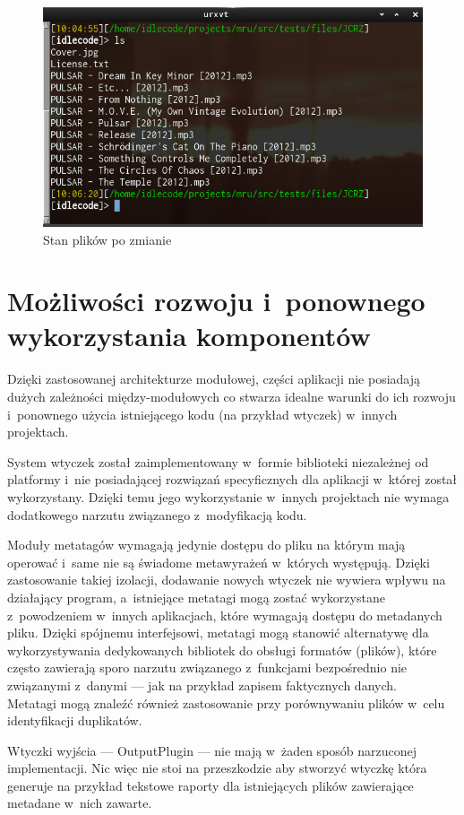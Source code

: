 \begin{figure}[h]
\begin{center}
\includegraphics[scale=0.70]{img/test_after.png}
\end{center}
\caption{Stan plików po zmianie}
\end{figure}

\section{Możliwości rozwoju i~ponownego wykorzystania komponentów}
\par
Dzięki zastosowanej architekturze modułowej, części aplikacji nie posiadają dużych zależności między-modułowych co stwarza idealne warunki do ich rozwoju i~ponownego użycia istniejącego kodu (na przykład wtyczek) w~innych projektach.

\par
System wtyczek został zaimplementowany w~formie biblioteki niezależnej od platformy i~nie posiadającej rozwiązań specyficznych dla aplikacji w~której został wykorzystany. Dzięki temu jego wykorzystanie w~innych projektach nie wymaga dodatkowego narzutu związanego z~modyfikacją kodu.

\par
Moduły metatagów wymagają jedynie dostępu do pliku na którym mają operować i~same nie są świadome metawyrażeń w~których występują. Dzięki zastosowanie takiej izolacji, dodawanie nowych wtyczek nie wywiera wpływu na działający program, a~istniejące metatagi mogą zostać wykorzystane z~powodzeniem w~innych aplikacjach, które wymagają dostępu do metadanych pliku. Dzięki spójnemu interfejsowi, metatagi mogą stanowić alternatywę dla wykorzystywania dedykowanych bibliotek do obsługi formatów (plików), które często zawierają sporo narzutu związanego z~funkcjami bezpośrednio nie związanymi z~danymi --- jak na przykład zapisem faktycznych danych.\\
Metatagi mogą znaleźć również zastosowanie przy porównywaniu plików w~celu identyfikacji duplikatów.

\par
Wtyczki wyjścia --- OutputPlugin --- nie mają w~żaden sposób narzuconej implementacji.
Nic więc nie stoi na przeszkodzie aby stworzyć wtyczkę która generuje na przykład tekstowe raporty dla istniejących plików zawierające metadane w~nich zawarte.
